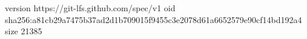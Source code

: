 version https://git-lfs.github.com/spec/v1
oid sha256:a81cb29a7475b37ad2d1b709015f9455c3e2078d61a6652579e90cf14bd192a4
size 21385
